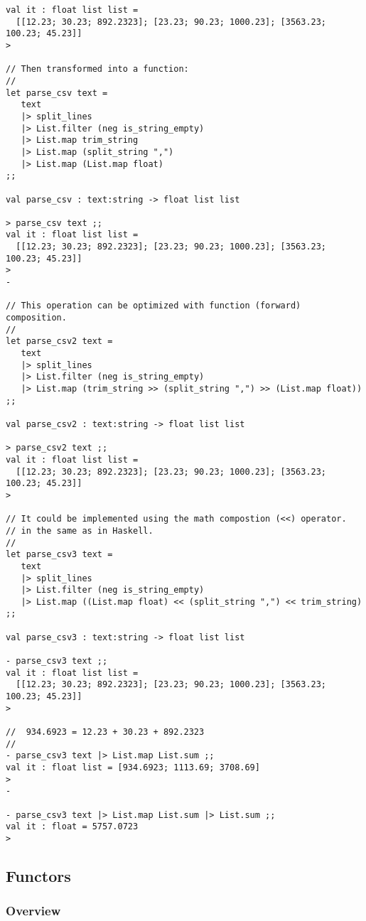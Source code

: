 \documentclass[11pt]{article}
\begin{document}
\begin{verbatim}
val it : float list list =
  [[12.23; 30.23; 892.2323]; [23.23; 90.23; 1000.23]; [3563.23; 100.23; 45.23]]
> 

// Then transformed into a function: 
//
let parse_csv text =
   text
   |> split_lines 
   |> List.filter (neg is_string_empty) 
   |> List.map trim_string 
   |> List.map (split_string ",") 
   |> List.map (List.map float) 
;;

val parse_csv : text:string -> float list list

> parse_csv text ;;
val it : float list list =
  [[12.23; 30.23; 892.2323]; [23.23; 90.23; 1000.23]; [3563.23; 100.23; 45.23]]
> 
- 

// This operation can be optimized with function (forward) composition.
// 
let parse_csv2 text =
   text
   |> split_lines 
   |> List.filter (neg is_string_empty) 
   |> List.map (trim_string >> (split_string ",") >> (List.map float)) 
;;

val parse_csv2 : text:string -> float list list

> parse_csv2 text ;;
val it : float list list =
  [[12.23; 30.23; 892.2323]; [23.23; 90.23; 1000.23]; [3563.23; 100.23; 45.23]]
> 

// It could be implemented using the math compostion (<<) operator.
// in the same as in Haskell.  
// 
let parse_csv3 text =
   text
   |> split_lines 
   |> List.filter (neg is_string_empty) 
   |> List.map ((List.map float) << (split_string ",") << trim_string) 
;;

val parse_csv3 : text:string -> float list list

- parse_csv3 text ;;
val it : float list list =
  [[12.23; 30.23; 892.2323]; [23.23; 90.23; 1000.23]; [3563.23; 100.23; 45.23]]
> 

//  934.6923 = 12.23 + 30.23 + 892.2323
//
- parse_csv3 text |> List.map List.sum ;;            
val it : float list = [934.6923; 1113.69; 3708.69]
> 
- 

- parse_csv3 text |> List.map List.sum |> List.sum ;;
val it : float = 5757.0723
>
\end{verbatim}

\subsection{Functors}
\label{sec-1-12}
\subsubsection{Overview}
\label{sec-1-12-1}
\end{document}
